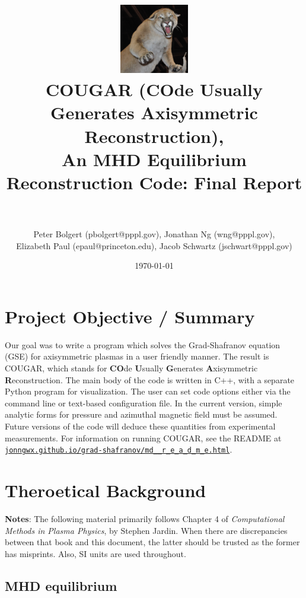 \documentclass[paper=letter, fontsize=11pt]{scrartcl} %
\title{	
\includegraphics[width=3cm]{Cougar_Nevada}
\normalfont \normalsize 
\horrule{0.5pt} \\[0.4cm] %
\LARGE COUGAR (\textbf{CO}de \textbf{U}sually \textbf{G}enerates \textbf{A}xisymmetric \textbf{R}econstruction), \\ \Large An MHD Equilibrium Reconstruction Code: Final Report\\ %
\horrule{2pt} \\[0.5cm] %
}
\author{Peter Bolgert (pbolgert@pppl.gov), Jonathan Ng (wng@pppl.gov), \\ Elizabeth Paul (epaul@princeton.edu), Jacob Schwartz (jschwart@pppl.gov)} %
\date{\normalsize\today} %
\begin{document}
\maketitle %


\section{Project Objective / Summary}

Our goal was to write a program which solves the Grad-Shafranov equation (GSE) for axisymmetric plasmas in a user friendly manner.  The result is COUGAR, which stands for \textbf{CO}de \textbf{U}sually \textbf{G}enerates \textbf{A}xisymmetric \textbf{R}econstruction.  The main body of the code is written in C++, with a separate Python program for visualization.  The user can set code options either via the command line or text-based configuration file.  In the current version, simple analytic forms for pressure and azimuthal magnetic field must be assumed.  Future versions of the code will deduce these quantities from experimental measurements.  For information on running COUGAR, see the README at \href{http://jonngwx.github.io/grad-shafranov/md__r_e_a_d_m_e.html}{\nolinkurl{jonngwx.github.io/grad-shafranov/md__r_e_a_d_m_e.html}}.


\section{Theroetical Background}

\textbf{Notes}: The following material primarily follows Chapter 4 of \textit{Computational Methods in Plasma Physics}, by Stephen Jardin.  When there are discrepancies between that book and this document, the latter should be trusted as the former has misprints.  Also, SI units are used throughout.

\subsection{MHD equilibrium}
\end{document}
